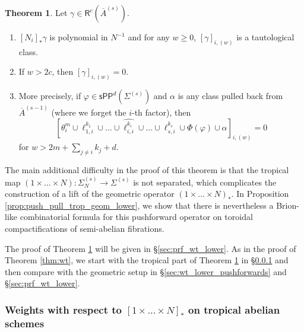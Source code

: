 \documentclass[11pt]{article}
\def\R{\mathsf{R}}
\newcommand{\barA}{\overline{A}}
\newcommand{\sPP}{\mathsf{sPP}}
\newcommand{\spp}{\sPP}
\theoremstyle{definition}
\newtheorem{theorem}[definition]{Theorem}
\begin{document}
\begin{theorem}\label{thm:wt_lower}
    Let $\gamma \in \R^{c}(\barA^{(s)})$.
	\begin{enumerate}[label = (\alph*)]
		\item $[N_i]_* \gamma$ is polynomial in $N^{-1}$ and for any $w \ge 0$, $[\gamma]_{i,(w)}$ is a tautological class.
		\item If $w>2c$, then $[\gamma]_{i,(w)} = 0$.
		\item More precisely, if $\varphi \in \spp^{d}(\Sigma^{(s)})$ and $\alpha$ is any class pulled back from $\barA^{(s-1)}$ (where we forget the $i$-th factor), then
			$$\left[\theta_i^{m}\cup\ell_{1,i}^{k_1}\cup\dots \cup\widehat{\ell_{i,i}^{k_i}}\cup\dots\cup\ell_{s,i}^{k_{s}}\cup\Phi(\varphi)\cup\alpha\right]_{i,(w)}=0$$
			for $w>2m+\sum_{j\neq i}k_j+d$.
	\end{enumerate}
\end{theorem}

The main additional difficulty in the proof of this theorem is that the tropical map $(1\times\dots\times N):\Sigma_N^{(s)}\to \Sigma^{(s)}$
is not separated, which complicates the construction of a lift of the geometric operator $(1\times\dots\times N)_{\ast}$.
In Proposition \ref{prop:push_pull_trop_geom_lower}, we show that there is nevertheless a Brion-like combinatorial formula for this pushforward
operator on toroidal compactifications of semi-abelian fibrations.

The proof of Theorem \ref{thm:wt_lower} will be given in \S\ref{sec:prf_wt_lower}. As in the proof of Theorem \ref{thm:wt},
we start with the tropical part of Theorem \ref{thm:wt_lower} in \S\ref{sec:wt_lower_trop} and then compare
with the geometric setup in \S\ref{sec:wt_lower_pushforwards} and \S\ref{sec:prf_wt_lower}.

\subsubsection{Weights with respect to $[1\times\dots\times N]_\ast$ on tropical abelian schemes}
\label{sec:wt_lower_trop}
\end{document}
